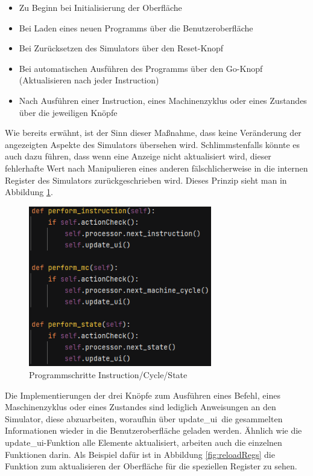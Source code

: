 \documentclass[12pt]{article}
\newcommand{\imgSpaceBefore}{\vspace{10pt}}
\begin{document}
\begin{itemize}
	\item Zu Beginn bei Initialisierung der Oberfläche
	\item Bei Laden eines neuen Programms über die Benutzeroberfläche
	\item Bei Zurücksetzen des Simulators über den Reset-Knopf
	\item Bei automatischen Ausführen des Programms über den Go-Knopf (Aktualisieren nach jeder Instruction)
	\item Nach Ausführen einer Instruction, eines Machinenzyklus oder eines Zustandes über die jeweiligen Knöpfe
\end{itemize}

\noindent
Wie bereits erwähnt, ist der Sinn dieser Maßnahme, dass keine Veränderung der angezeigten Aspekte des Simulators übersehen wird. Schlimmstenfalls könnte es auch dazu führen, dass wenn eine Anzeige nicht aktualisiert wird, dieser fehlerhafte Wert nach Manipulieren eines anderen fälschlicherweise in die internen Register des Simulators zurückgeschrieben wird. Dieses Prinzip sieht man in Abbildung \ref{fig:perf}.\imgSpaceBefore

\begin{figure}[H]
\centering
\includegraphics[width=8cm]{bilder/Perform}
\caption{Programmschritte Instruction/Cycle/State}
\label{fig:perf}
\end{figure}

\noindent
Die Implementierungen der drei Knöpfe zum Ausführen eines Befehl, eines Maschinenzyklus oder eines Zustandes sind lediglich Anweisungen an den Simulator, diese abzuarbeiten, woraufhin über \glqq update\_ui\grqq\ die gesammelten Informationen wieder in die Benutzeroberfläche geladen werden. Ähnlich wie die \glqq update\_ui\grqq-Funktion alle Elemente aktualisiert, arbeiten auch die einzelnen Funktionen darin. Als Beispiel dafür ist in Abbildung \ref{fig:reloadRegs} die Funktion zum aktualisieren der Oberfläche für die speziellen Register zu sehen.\imgSpaceBefore
\end{document}
